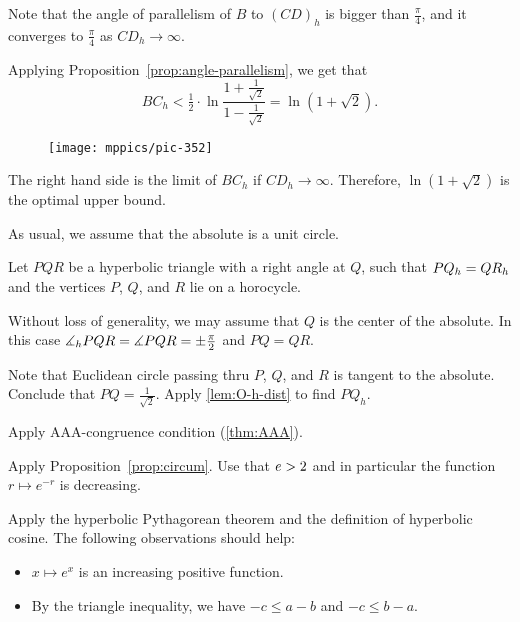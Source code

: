 Note that the angle of parallelism of $B$ to $(CD)_h$ is bigger than $\tfrac\pi4$,
and it converges to $\tfrac\pi4$ as $CD_h\to\infty$.

Applying Proposition~\ref{prop:angle-parallelism},
we get that
$$BC_h<\tfrac12\cdot\ln\frac{1+\frac1{\sqrt{2}}}{1-\frac1{\sqrt{2}}}=\ln\left(1+\sqrt{2}\right).$$

{

\begin{wrapfigure}{r}{45mm}
\vskip-4mm
\centering
\texttt{[image: mppics/pic-352]}
\end{wrapfigure}

The right hand side is the limit of $BC_h$ if $CD_h\to\infty$.
Therefore, $\ln\left(1+\sqrt{2}\right)$ is the optimal upper bound.

As usual, we assume that the absolute is a unit circle.

Let $PQR$ be a hyperbolic triangle
with a right angle at $Q$, such that $PQ_h\z=QR_h$
and the vertices $P$, $Q$, and $R$ 
lie on a horocycle.

Without loss of generality, we may assume that $Q$ is the center of the absolute.
In this case $\measuredangle_hPQR\z=\measuredangle PQR\z=\pm\tfrac\pi2$ and $PQ=QR$.

}

Note that Euclidean circle passing thru $P$, $Q$, and $R$ is tangent to the absolute.
Conclude that $PQ=\tfrac1{\sqrt2}$. 
Apply \ref{lem:O-h-dist} to find $PQ_h$.


Apply AAA-congruence condition (\ref{thm:AAA}).

Apply Proposition~\ref{prop:circum}.
Use that $e\z>2$ and in particular the function $r\mapsto e^{-r}$ is decreasing.

Apply the hyperbolic Pythagorean theorem and the definition of hyperbolic cosine.
The following observations should help:
\begin{itemize}
 \item $x\mapsto e^x$ is an increasing positive function.
 \item By the triangle inequality,  we have $-c\le a-b$ and $-c\le b-a$.
\end{itemize}


